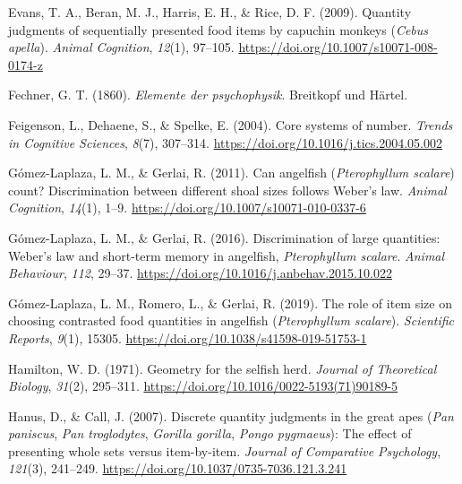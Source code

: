 \documentclass[
  ,pub,floatsintext]{apa6}
\newlength{\cslhangindent}
\newlength{\cslentryspacingunit} %
\newenvironment{CSLReferences}[2] %
 {%
  \setlength{\parindent}{0pt}
  \ifodd #1
  \let\oldpar\par
  \def\par{\hangindent=\cslhangindent\oldpar}
  \fi
  \setlength{\parskip}{#2\cslentryspacingunit}
 }%
 {}
\begin{document}
\begin{CSLReferences}{1}{0}
\leavevmode{}%
Evans, T. A., Beran, M. J., Harris, E. H., \& Rice, D. F. (2009). Quantity judgments of sequentially presented food items by capuchin monkeys (\emph{{Cebus} apella}). \emph{Animal Cognition}, \emph{12}(1), 97--105. \url{https://doi.org/10.1007/s10071-008-0174-z}

\leavevmode{}%
Fechner, G. T. (1860). \emph{Elemente der psychophysik}. Breitkopf und Härtel.

\leavevmode{}%
Feigenson, L., Dehaene, S., \& Spelke, E. (2004). Core systems of number. \emph{Trends in Cognitive Sciences}, \emph{8}(7), 307--314. \url{https://doi.org/10.1016/j.tics.2004.05.002}

\leavevmode{}%
Gómez-Laplaza, L. M., \& Gerlai, R. (2011). Can angelfish (\emph{{Pterophyllum} scalare}) count? {Discrimination} between different shoal sizes follows {Weber}'s law. \emph{Animal Cognition}, \emph{14}(1), 1--9. \url{https://doi.org/10.1007/s10071-010-0337-6}

\leavevmode{}%
Gómez-Laplaza, L. M., \& Gerlai, R. (2016). Discrimination of large quantities: {Weber}'s law and short-term memory in angelfish, \emph{{Pterophyllum} scalare}. \emph{Animal Behaviour}, \emph{112}, 29--37. \url{https://doi.org/10.1016/j.anbehav.2015.10.022}

\leavevmode{}%
Gómez-Laplaza, L. M., Romero, L., \& Gerlai, R. (2019). The role of item size on choosing contrasted food quantities in angelfish (\emph{{Pterophyllum} scalare}). \emph{Scientific Reports}, \emph{9}(1), 15305. \url{https://doi.org/10.1038/s41598-019-51753-1}

\leavevmode{}%
Hamilton, W. D. (1971). Geometry for the selfish herd. \emph{Journal of Theoretical Biology}, \emph{31}(2), 295--311. \url{https://doi.org/10.1016/0022-5193(71)90189-5}

\leavevmode{}%
Hanus, D., \& Call, J. (2007). Discrete quantity judgments in the great apes (\emph{{Pan} paniscus}, \emph{{Pan} troglodytes}, \emph{{Gorilla} gorilla}, \emph{{Pongo} pygmaeus}): {The} effect of presenting whole sets versus item-by-item. \emph{Journal of Comparative Psychology}, \emph{121}(3), 241--249. \url{https://doi.org/10.1037/0735-7036.121.3.241}


\end{CSLReferences}
\end{document}
